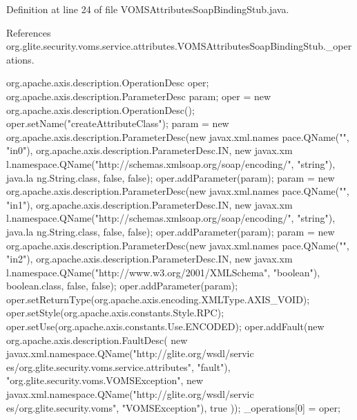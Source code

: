 Definition at line 24 of file VOMSAttributesSoapBindingStub.java.



References org.glite.security.voms.service.attributes.VOMSAttributesSoapBindingStub.\_\-operations.


\begin{DoxyCode}
                                             {
        org.apache.axis.description.OperationDesc oper;
        org.apache.axis.description.ParameterDesc param;
        oper = new org.apache.axis.description.OperationDesc();
        oper.setName("createAttributeClass");
        param = new org.apache.axis.description.ParameterDesc(new javax.xml.names
      pace.QName("", "in0"), org.apache.axis.description.ParameterDesc.IN, new javax.xm
      l.namespace.QName("http://schemas.xmlsoap.org/soap/encoding/", "string"), java.la
      ng.String.class, false, false);
        oper.addParameter(param);
        param = new org.apache.axis.description.ParameterDesc(new javax.xml.names
      pace.QName("", "in1"), org.apache.axis.description.ParameterDesc.IN, new javax.xm
      l.namespace.QName("http://schemas.xmlsoap.org/soap/encoding/", "string"), java.la
      ng.String.class, false, false);
        oper.addParameter(param);
        param = new org.apache.axis.description.ParameterDesc(new javax.xml.names
      pace.QName("", "in2"), org.apache.axis.description.ParameterDesc.IN, new javax.xm
      l.namespace.QName("http://www.w3.org/2001/XMLSchema", "boolean"), boolean.class, 
      false, false);
        oper.addParameter(param);
        oper.setReturnType(org.apache.axis.encoding.XMLType.AXIS_VOID);
        oper.setStyle(org.apache.axis.constants.Style.RPC);
        oper.setUse(org.apache.axis.constants.Use.ENCODED);
        oper.addFault(new org.apache.axis.description.FaultDesc(
                      new javax.xml.namespace.QName("http://glite.org/wsdl/servic
      es/org.glite.security.voms.service.attributes", "fault"),
                      "org.glite.security.voms.VOMSException",
                      new javax.xml.namespace.QName("http://glite.org/wsdl/servic
      es/org.glite.security.voms", "VOMSException"), 
                      true
                     ));
        _operations[0] = oper;

}
\end{DoxyCode}
